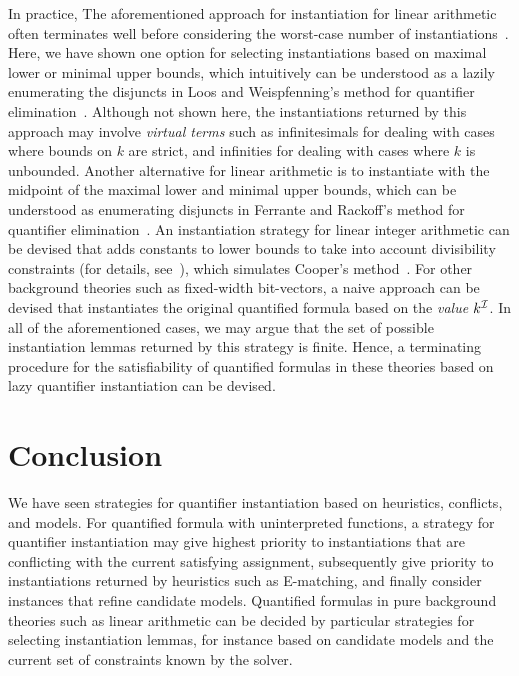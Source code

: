 \documentclass{easychair}
\begin{document}
In practice,
The aforementioned approach for instantiation for linear arithmetic often terminates well before considering the worst-case number of instantiations~\cite{DBLP:conf/lpar/BjornerJ15,InstLA2016}.
Here, we have shown one option for selecting instantiations based on maximal lower or minimal upper bounds,
which intuitively can be understood as a lazily enumerating the disjuncts in Loos and Weispfenning's method for quantifier elimination~\cite{Loos93applyinglinear}.
Although not shown here, the instantiations returned by this approach may involve \emph{virtual terms} such as infinitesimals for dealing with cases where bounds on $k$ are strict,
and infinities for dealing with cases where $k$ is unbounded.
Another alternative for linear arithmetic is to instantiate with the midpoint of the
maximal lower and minimal upper bounds,
which can be understood as enumerating disjuncts in Ferrante and Rackoff's method for quantifier elimination~\cite{FerranteRackoff79ComputationalComplexityLogicalTheories}.
An instantiation strategy for linear integer arithmetic can be devised that adds constants to lower bounds to take into account divisibility constraints (for details, see~\cite{InstLA2016}),
which simulates Cooper's method~\cite{cooper1972}.
For other background theories such as fixed-width bit-vectors, 
a naive approach can be devised that instantiates the original quantified formula based on the \emph{value} $k^{\mathcal{I}}$.
In all of the aforementioned cases, we may argue that the set of possible instantiation lemmas returned by this strategy is finite.
Hence, a terminating procedure for the satisfiability of quantified formulas in these theories based on lazy quantifier instantiation can be devised.


\section{Conclusion}
\label{sec:conclusion}

We have seen strategies for quantifier instantiation
based on heuristics, conflicts, and models.
For quantified formula with uninterpreted functions,
a strategy for quantifier instantiation may give highest priority to instantiations that
are conflicting with the current satisfying assignment,
subsequently give priority to instantiations returned by heuristics such as E-matching,
and finally consider instances that refine candidate models.
Quantified formulas in pure background theories such as linear arithmetic can be 
decided by particular strategies for selecting instantiation lemmas, for instance
based on candidate models and the current set of constraints known by the solver.
\end{document}
